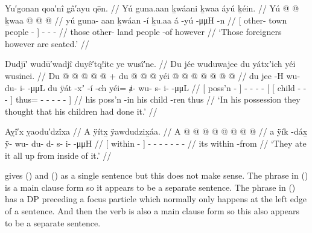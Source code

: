 \ex\label{ex:92-16-foreigners-are-seated}%
%
\begingl
	\glpreamble	Yu′g̣onan qoa′nî g̣â′ayu qēn. //
	\glpreamble	Yú g̱una.aan ḵwáani ḵwaa áyú ḵéin. //
	\gla	{} Yú  @ {}  @ {} {}
		ḵwaa  @ {}  @ {} @ {} //
	\glb	{} yú g̱una- aan ḵwáan -í {}
		ḵu.aa á -yú  -μμH -n //
	\glc	{}[  other- town people - {}]
		  -  - - //
	\gld	{} those other- land people -of {}
		however  {}  {} {} //
	\glft	‘Those foreigners however are seated.’
		//
\endgl
\xe

\ex\label{ex:92-17-thought-children-did-it}%
%
\begingl
	\glpreamble	Dudjī′ wudū′wadjî duyê′tq!itc ye wusî′ne. //
	\glpreamble	Du jée wuduwajee du yátxʼich yéi wusinei. //
	\gla	{} Du  @ {} {}
		 @ {} @ {} @ {} @ {} +
		{} {} du  @ {} @ {} @ {} {}
			yéi @  @ {} @ {} @ {} @ {} @ {} @ {} {} //
	\glb	{} du jee -H {}
		wu- du- i-  -μμL
		{} {} du ÿát -xʼ -í -ch {}
			yéi= ⱥ- wu- s- i-  -μμL {} {} //
	\glc	{}[  poss’n - {}]
		- - -  -
		{}[ {}[  child - - - {}]
			thus= - - - -
				 - \· {}] //
	\gld	{} his poss’n -in {}  {} {} {} {}
		{} {} his child -ren {} {} {}
			thus  {} {} {} {} {} {} {} //
	\glft	‘In his possession they thought that his children had done it.’
		//
\endgl
\xe

\ex\label{ex:92-18-ate-it-all-up}%
%
\begingl
	\glpreamble	Aỵî′x ỵaodu′dzîxa //
	\glpreamble	A ÿítx̱ ÿawdudzix̱áa. //
	\gla	{} A  @ {} {}
			 @ {} @ {} @ {} @ {} @ {} @ {} @ {} //
	\glb	{} a ÿík -dáx̱ {} 
			ÿ- wu- du- d- s- i-  -μμH //
	\glc	{}[  within - {}]
			- - - - - -
				 - //
	\gld	{} its within -from {}
			 {} {} {} {} {} {} {} //
	\glft	‘They ate it all up from inside of it.’
		//
\endgl
\xe

\citeauthor{swanton:1909} gives (\lastx) and (\nextx) as a single sentence but this does not make sense.
The phrase in (\lastx) is a main clause form so it appears to be a separate sentence.
The phrase in (\nextx) has a DP  preceding a focus particle  which normally only happens at the left edge of a sentence.
And then the verb  is also a main clause form so this also appears to be a separate sentence.

